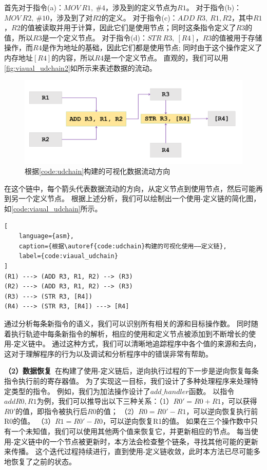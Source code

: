 首先对于指令(a)：$MOV\ R1,\ \#4$，涉及到的定义节点为$R1$。
对于指令(b)：$MOV\ R2,\ \#10$，涉及到了对$R2$的定义。
对于指令(c)：$ADD\ R3,\ R1, R2$，其中$R1$，$R2$的值被读取并用于计算，因此它们是使用节点；同时这条指令定义了$R3$的值，所以$R3$是一个定义节点。
对于指令(d)：$STR\ R3,\ [R4]$，$R3$的值被用于存储操作，而$R4$是作为地址的基础，因此它们都是使用节点;
同时由于这个操作定义了内存地址$[R4]$的内容，所以$R4$是一个定义节点。
直观的，我们可以用\autoref{fig:viaual_udchain2}如所示来表述数据的流动。
\begin{figure}[h]
    \centering
    \includegraphics[width=1.0\textwidth]{./figure/UD-visual.png}
    \caption{根据\autoref{code:udchain}构建的可视化数据流动方向}
    \label{fig:viaual_udchain2}
\end{figure}
在这个链中，每个箭头代表数据流动的方向，从定义节点到使用节点，然后可能再到另一个定义节点。
根据上述分析，我们可以绘制出一个使用-定义链的简化图，如\autoref{code:viaual_udchain}所示。

\begin{lstlisting}[
    language={asm},
    caption={根据\autoref{code:udchain}构建的可视化使用——定义链},
    label={code:viaual_udchain}
]
(R1) ---> (ADD R3, R1, R2) --> (R3)
(R2) ---> (ADD R3, R1, R2) --> (R3)
(R3) ---> (STR R3, [R4])
(R4) ---> (STR R3, [R4]) ---> [R4]
\end{lstlisting}

通过分析每条新指令的语义，我们可以识别所有相关的源和目标操作数。
同时随着执行轨迹中每条新指令的解析，相应的使用和定义节点被添加到不断增长的使用-定义链中。
通过这种方式，我们可以清晰地追踪程序中各个值的来源和去向，这对于理解程序的行为以及调试和分析程序中的错误非常有帮助。

\textbf{（2）数据恢复}\ 在构建了使用-定义链后，逆向执行过程的下一步是逆向恢复每条指令执行前的寄存器值。
为了实现这一目标，我们设计了多种处理程序来处理特定类型的指令。
例如，我们为加法操作设计了$add\_handler$函数。
以指令$add R0, R1$为例，我们可以推导出以下三种关系：（1）$R0'=R0+R1$，可以获得$R0'$的值，即指令被执行后$R0$的值；
（2）$R0=R0'−R1$，可以逆向恢复执行前R0的值。
（3）$R1=R0'−R0$，可以逆向恢复R1的值。
如果在三个操作数中只有一个未知值，我们可以使用其他两个值来恢复它，并更新相应的节点。
每当使用-定义链中的一个节点被更新时，本方法会检查整个链条，寻找其他可能的更新来传播。
这个迭代过程持续进行，直到使用-定义链收敛，此时本方法已尽可能多地恢复了之前的状态。

